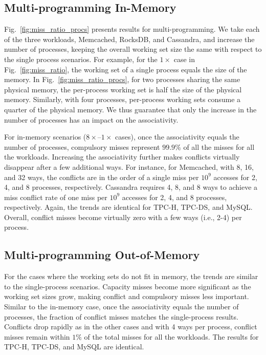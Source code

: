 \subsection{Multi-programming In-Memory}
Fig.~\ref{fig:miss_ratio_procs} presents results for multi-programming. We take each of the three workloads, Memcached, RocksDB, and Cassandra, and increase the number of processes, keeping the overall working set size the same with respect to the single process scenarios. For example, for the $1\times$ case in Fig.~\ref{fig:miss_ratio}, the working set of a single process equals the size of the memory. In Fig.~\ref{fig:miss_ratio_procs}, for two processes sharing the same physical memory, the per-process working set is half the size of the physical memory. Similarly, with four processes, per-process working sets consume a quarter of the physical memory. We thus guarantee that only the increase in the number of processes has an impact on the associativity. 

For in-memory scenarios ($8\times$--$1\times$ cases), once the associativity equals the number of processes, compulsory misses represent $99.9\%$ of all the misses for all the workloads. Increasing the associativity further makes conflicts virtually disappear after a few additional ways. For instance, for Memcached, with 8, 16, and 32 ways, the conflicts are in the order of a single miss per $10^{9}$ accesses for 2, 4, and 8 processes, respectively. Cassandra requires 4, 8, and 8 ways to achieve a miss conflict rate of one miss per $10^{9}$ accesses for 2, 4, and 8 processes, respectively. Again, the trends are identical for TPC-H, TPC-DS, and MySQL. Overall, conflict misses become virtually zero with a few ways (i.e., 2-4) per process.

\subsection{Multi-programming Out-of-Memory}

For the cases where the working sets do not fit in memory, the trends are similar to the single-process scenarios. Capacity misses become more significant as the working set sizes grow, making conflict and compulsory misses less important. Similar to the in-memory case, once the associativity equals the number of processes, the fraction of conflict misses matches the single-process results. Conflicts drop rapidly as in the other cases and with 4 ways per process, conflict misses remain within $1\%$ of the total misses for all the workloads. The results for TPC-H, TPC-DS, and MySQL are identical.

